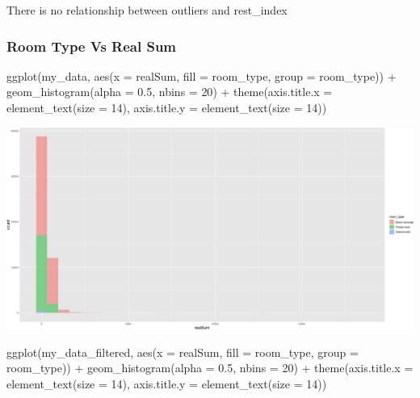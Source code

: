 \documentclass[
]{article}
\newenvironment{Shaded}{\begin{snugshade}}{\end{snugshade}}
\newcommand{\AttributeTok}[1]{\textcolor[rgb]{0.77,0.63,0.00}{#1}}
\newcommand{\DecValTok}[1]{\textcolor[rgb]{0.00,0.00,0.81}{#1}}
\newcommand{\FloatTok}[1]{\textcolor[rgb]{0.00,0.00,0.81}{#1}}
\newcommand{\FunctionTok}[1]{\textcolor[rgb]{0.00,0.00,0.00}{#1}}
\newcommand{\NormalTok}[1]{#1}
\newcommand{\SpecialCharTok}[1]{\textcolor[rgb]{0.00,0.00,0.00}{#1}}
\begin{document}
There is no relationship between outliers and rest\_index

\hypertarget{room-type-vs-real-sum}{%
\subsubsection{Room Type Vs Real Sum}\label{room-type-vs-real-sum}}

\begin{Shaded}
\begin{Highlighting}[]
\FunctionTok{ggplot}\NormalTok{(my\_data, }\FunctionTok{aes}\NormalTok{(}\AttributeTok{x =}\NormalTok{ realSum, }\AttributeTok{fill =}\NormalTok{ room\_type, }\AttributeTok{group =}\NormalTok{ room\_type)) }\SpecialCharTok{+}
    \FunctionTok{geom\_histogram}\NormalTok{(}\AttributeTok{alpha =} \FloatTok{0.5}\NormalTok{, }\AttributeTok{nbins =} \DecValTok{20}\NormalTok{) }\SpecialCharTok{+} \FunctionTok{theme}\NormalTok{(}\AttributeTok{axis.title.x =} \FunctionTok{element\_text}\NormalTok{(}\AttributeTok{size =} \DecValTok{14}\NormalTok{),}
    \AttributeTok{axis.title.y =} \FunctionTok{element\_text}\NormalTok{(}\AttributeTok{size =} \DecValTok{14}\NormalTok{))}
\end{Highlighting}
\end{Shaded}

\includegraphics{Project_files/figure-latex/unnamed-chunk-18-1.png}

\begin{Shaded}
\begin{Highlighting}[]
\FunctionTok{ggplot}\NormalTok{(my\_data\_filtered, }\FunctionTok{aes}\NormalTok{(}\AttributeTok{x =}\NormalTok{ realSum, }\AttributeTok{fill =}\NormalTok{ room\_type, }\AttributeTok{group =}\NormalTok{ room\_type)) }\SpecialCharTok{+}
    \FunctionTok{geom\_histogram}\NormalTok{(}\AttributeTok{alpha =} \FloatTok{0.5}\NormalTok{, }\AttributeTok{nbins =} \DecValTok{20}\NormalTok{) }\SpecialCharTok{+} \FunctionTok{theme}\NormalTok{(}\AttributeTok{axis.title.x =} \FunctionTok{element\_text}\NormalTok{(}\AttributeTok{size =} \DecValTok{14}\NormalTok{),}
    \AttributeTok{axis.title.y =} \FunctionTok{element\_text}\NormalTok{(}\AttributeTok{size =} \DecValTok{14}\NormalTok{))}
\end{Highlighting}
\end{Shaded}
\end{document}
